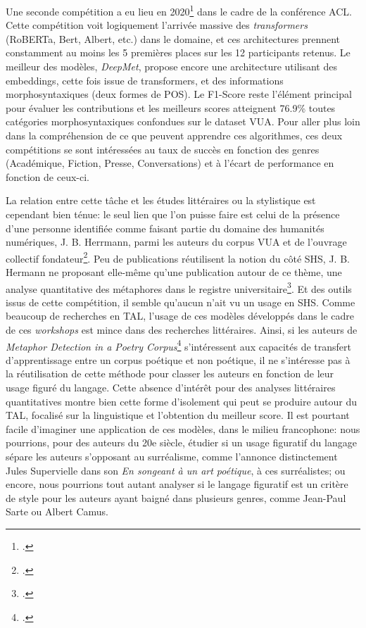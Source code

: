 Une seconde compétition a eu lieu en 2020\footcite{leong_report_2020} dans le cadre de la conférence ACL. Cette compétition voit logiquement l'arrivée massive des \textit{transformers} (RoBERTa, Bert, Albert, etc.) dans le domaine, et ces architectures prennent constamment au moins les 5 premières places sur les 12 participants retenus. Le meilleur des modèles, \textit{DeepMet}, propose encore une architecture utilisant des embeddings, cette fois issue de transformers, et des informations morphosyntaxiques (deux formes de POS). Le F1-Score reste l'élément principal pour évaluer les contributions et les meilleurs scores atteignent 76.9\% toutes catégories morphosyntaxiques confondues sur le dataset VUA. Pour aller plus loin dans la compréhension de ce que peuvent apprendre ces algorithmes, ces deux compétitions se sont intéressées au taux de succès en fonction des genres (Académique, Fiction, Presse, Conversations) et à l'écart de performance en fonction de ceux-ci. %

La relation entre cette tâche et les études littéraires ou la stylistique est cependant bien ténue: le seul lien que l'on puisse faire est celui de la présence d'une personne identifiée comme faisant partie du domaine des humanités numériques, J. B. Herrmann, parmi les auteurs du corpus VUA et de l'ouvrage collectif fondateur\footcite{steen_method_2010}. Peu de publications réutilisent la notion du côté SHS, J. B. Hermann ne proposant elle-même qu'une publication autour de ce thème, une analyse quantitative des métaphores dans le registre universitaire\footcite{herrmann_high_2015}. Et des outils issus de cette compétition, il semble qu'aucun n'ait vu un usage en SHS. Comme beaucoup de recherches en TAL, l'usage de ces modèles développés dans le cadre de ces \textit{workshops} est mince dans des recherches littéraires. Ainsi, si les auteurs de \textit{Metaphor Detection in a Poetry Corpus}\footcite{kesarwani_metaphor_2017} s'intéressent aux capacités de transfert d'apprentissage entre un corpus poétique et non poétique, il ne s'intéresse pas à la réutilisation de cette méthode pour classer les auteurs en fonction de leur usage figuré du langage. Cette absence d'intérêt pour des analyses littéraires quantitatives montre bien cette forme d'isolement qui peut se produire autour du TAL, focalisé sur la linguistique et l'obtention du meilleur score. Il est pourtant facile d'imaginer une application de ces modèles, dans le milieu francophone: nous pourrions, pour des auteurs du 20e siècle, étudier si un usage figuratif du langage sépare les auteurs s'opposant au surréalisme, comme l'annonce distinctement Jules Supervielle dans son \textit{En songeant à un art poétique}, à ces surréalistes; ou encore, nous pourrions tout autant analyser si le langage figuratif est un critère de style pour les auteurs ayant baigné dans plusieurs genres, comme Jean-Paul Sarte ou Albert Camus.

